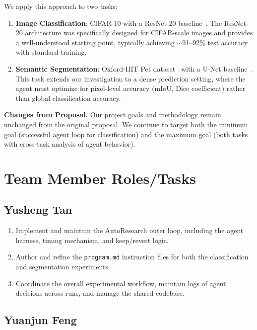 \documentclass[10pt,twocolumn,letterpaper]{article}
\begin{document}
We apply this approach to two tasks:
\begin{enumerate}
    \item \textbf{Image Classification}: CIFAR-10 with a ResNet-20 baseline~\cite{He2016ResNet}. The ResNet-20 architecture was specifically designed for CIFAR-scale images and provides a well-understood starting point, typically achieving $\sim$91--92\% test accuracy with standard training.
    \item \textbf{Semantic Segmentation}: Oxford-IIIT Pet dataset~\cite{Parkhi2012Pets} with a U-Net baseline~\cite{Ronneberger2015UNet}. This task extends our investigation to a dense prediction setting, where the agent must optimize for pixel-level accuracy (mIoU, Dice coefficient) rather than global classification accuracy.
\end{enumerate}

\noindent\textbf{Changes from Proposal.} Our project goals and methodology remain unchanged from the original proposal. We continue to target both the minimum goal (successful agent loop for classification) and the maximum goal (both tasks with cross-task analysis of agent behavior).


\section{Team Member Roles/Tasks}
\label{sec:roles}

\subsection{Yusheng Tan}

\begin{enumerate}

\item Implement and maintain the AutoResearch outer loop, including the agent harness, timing mechanism, and keep/revert logic.
\item Author and refine the \texttt{program.md} instruction files for both the classification and segmentation experiments.
\item Coordinate the overall experimental workflow, maintain logs of agent decisions across runs, and manage the shared codebase.

\end{enumerate}

\subsection{Yuanjun Feng}
\end{document}
